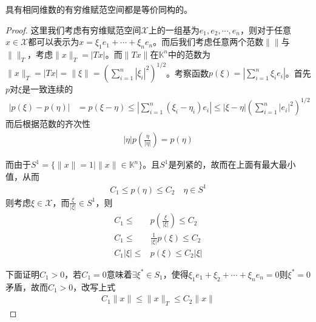 	\begin{theorem}
		具有相同维数的有穷维赋范空间都是等价同构的。
	\end{theorem}
	\begin{proof}
		这里我们考虑有穷维赋范空间$\mathscr{X}$上的一组基为$e_1,e_2,\cdots,e_n$，则对于任意$x\in\mathscr{X}$都可以表示为$x = \xi_1e_1 + \cdots + \xi_ne_n$。而后我们考虑任意两个范数$\| \|$与$\| \|_T$，考虑$\|x\|_T = |Tx|$。而$\|Tx\|$在$\mathbb{K}^n$中的范数为$\|x\|_T = |Tx| = \|\xi\| = \left(\sum\limits_{i=1}^n |\xi_i|^2 \right)^{1/2}$。考察函数$p(\xi) = \left|\sum\limits_{i=1}^n \xi_i e_i\right|$。首先$p$对$\xi$是一致连续的
		\begin{align*}
			|p(\xi) - p(\eta)| &= p(\xi - \eta) \leqslant \left|\sum\limits_{i=1}^n (\xi_i - \eta_i) e_i \right| \leqslant |\xi - \eta| \left(\sum\limits_{i=1}^n |e_i|^2 \right)^{1/2}
		\end{align*}
		而后根据范数的齐次性
		\begin{align*}
			|\eta|p(\frac{\eta}{|\eta|}) = p(\eta)
		\end{align*}
		
		而由于$S^1 = \{\|x\| = 1\mid \|x\|\in\mathbb{K}^n\}$。且$S^1$是列紧的，故而在上面有最大最小值，从而
		\begin{align*}
			C_1 \leqslant p(\eta) \leqslant C_2 \quad \eta \in S^1
		\end{align*}
		则考虑$\xi\in \mathscr{X}$，而$\frac{\xi}{|\xi|}\in S^1$，则
		\begin{align*}
			C_1 \leqslant & p(\frac{\xi}{|\xi|}) \leqslant C_2 \\
			C_1 \leqslant & \frac{1}{|\xi|}p(\xi) \leqslant C_2 \\
			C_1 |\xi| \leqslant & p(\xi) \leqslant C_2 |\xi|
		\end{align*}
		
		下面证明$C_1>0$，若$C_1 = 0$意味着$\exists \xi^*\in S_1$，使得$\xi_1 e_1 + \xi_2 + \cdots + \xi_n e_n = 0$则$\xi^* = 0$矛盾，故而$C_1>0$，改写上式
		\begin{align*}
			C_1 \|x\|\leqslant \|x\|_T \leqslant C_2\|x\|
		\end{align*}
	\end{proof}
	
